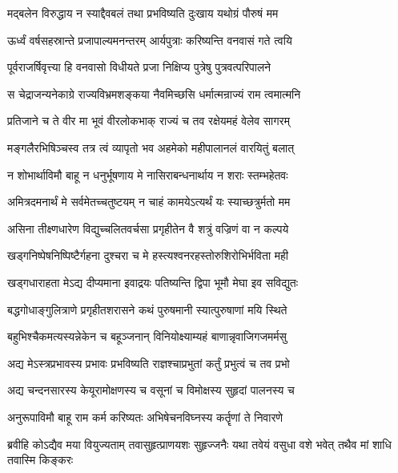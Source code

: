 \twolineshloka
{मद्बलेन विरुद्धाय न स्याद्दैवबलं तथा}
{प्रभविष्यति दुःखाय यथोग्रं पौरुषं मम} %

\twolineshloka
{ऊर्ध्वं वर्षसहस्रान्ते प्रजापाल्यमनन्तरम्}
{आर्यपुत्राः करिष्यन्ति वनवासं गते त्वयि} %

\twolineshloka
{पूर्वराजर्षिवृत्त्या हि वनवासो विधीयते}
{प्रजा निक्षिप्य पुत्रेषु पुत्रवत्परिपालने} %

\twolineshloka
{स चेद्राजन्यनेकाग्रे राज्यविभ्रमशङ्कया}
{नैवमिच्छसि धर्मात्मन्राज्यं राम त्वमात्मनि} %

\twolineshloka
{प्रतिजाने च ते वीर मा भूवं वीरलोकभाक्}
{राज्यं च तव रक्षेयमहं वेलेव सागरम्} %

\twolineshloka
{मङ्गलैरभिषिञ्चस्व तत्र त्वं व्यापृतो भव}
{अहमेको महीपालानलं वारयितुं बलात्} %

\twolineshloka
{न शोभार्थाविमौ बाहू न धनुर्भूषणाय मे}
{नासिराबन्धनार्थाय न शराः स्तम्भहेतवः} %

\twolineshloka
{अमित्रदमनार्थं मे सर्वमेतच्चतुष्टयम्}
{न चाहं कामयेऽत्यर्थं यः स्याच्छत्रुर्मतो मम} %

\twolineshloka
{असिना तीक्ष्णधारेण विद्युच्चलितवर्चसा}
{प्रगृहीतेन वै शत्रुं वज्रिणं वा न कल्पये} %

\twolineshloka
{खड्गनिष्पेषनिष्पिष्टैर्गहना दुश्चरा च मे}
{हस्त्यश्वनरहस्तोरुशिरोभिर्भविता मही} %

\twolineshloka
{खड्गधाराहता मेऽद्य दीप्यमाना इवाद्रयः}
{पतिष्यन्ति द्विपा भूमौ मेघा इव सविद्युतः} %

\twolineshloka
{बद्धगोधाङ्गुलित्राणे प्रगृहीतशरासने}
{कथं पुरुषमानी स्यात्पुरुषाणां मयि स्थिते} %

\twolineshloka
{बहुभिश्चैकमत्यस्यन्नेकेन च बहूञ्जनान्}
{विनियोक्ष्याम्यहं बाणान्नृवाजिगजमर्मसु} %

\twolineshloka
{अद्य मेऽस्त्रप्रभावस्य प्रभावः प्रभविष्यति}
{राज्ञश्चाप्रभुतां कर्तुं प्रभुत्वं च तव प्रभो} %

\twolineshloka
{अद्य चन्दनसारस्य केयूरामोक्षणस्य च}
{वसूनां च विमोक्षस्य सुहृदां पालनस्य च} %

\twolineshloka
{अनुरूपाविमौ बाहू राम कर्म करिष्यतः}
{अभिषेचनविघ्नस्य कर्तॄणां ते निवारणे} %

\fourlineindentedshloka
{ब्रवीहि कोऽद्यैव मया वियुज्यताम्}
{तवासुहृत्प्राणयशः सुहृज्जनैः}
{यथा तवेयं वसुधा वशे भवेत्}
{तथैव मां शाधि तवास्मि किङ्करः} %

